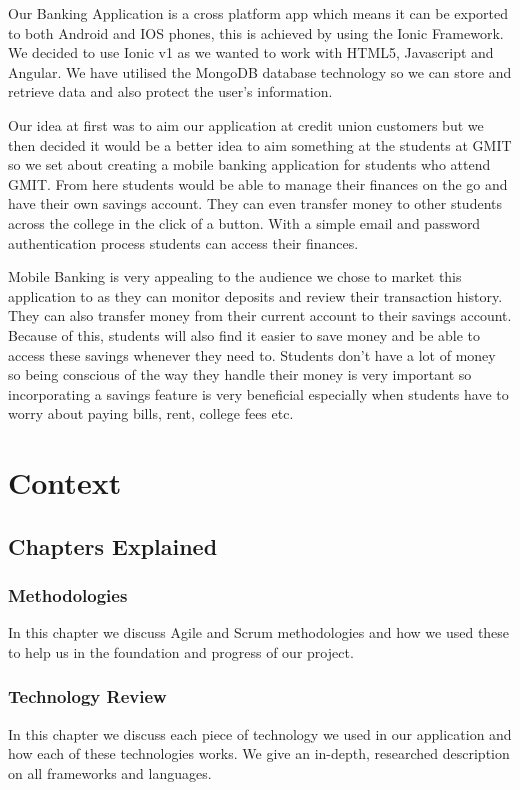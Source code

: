 	Our Banking Application is a cross platform app which means it can be exported to both 
Android and IOS phones, this is achieved by using the Ionic Framework. We decided to use Ionic v1 as we wanted to work with HTML5, Javascript and Angular. We have utilised the MongoDB database technology so we can store and retrieve data and also protect the user’s information.

Our idea at first was to aim our application at credit union customers but we then decided it would be a better idea to aim something at the students at GMIT so we set about creating a mobile banking application for students who attend GMIT. From here students would be able to manage their finances on the go and have their own savings account. They can even transfer money to other students across the college in the click of a button. With a simple email and password authentication process students can access their finances.

Mobile Banking is very appealing to the audience we chose to market this application to as they can monitor deposits and review their transaction history. They can also transfer money from their current account to their savings account. Because of this, students will also find it easier to save money and be able to access these savings whenever they need to. Students don’t have a lot of money so being conscious of the way they handle their money is very important so incorporating a savings feature is very beneficial especially when students have to worry about paying bills, rent, college fees etc.


	


\chapter{Context}

\section{Chapters Explained}
\subsection{Methodologies}
In this chapter we discuss Agile and Scrum methodologies and how we used these to help us in the foundation and progress of our project.

\subsection{Technology Review}
In this chapter we discuss each piece of technology we used in our application and how each of these technologies works. We give an in-depth, researched description on all frameworks and languages.

